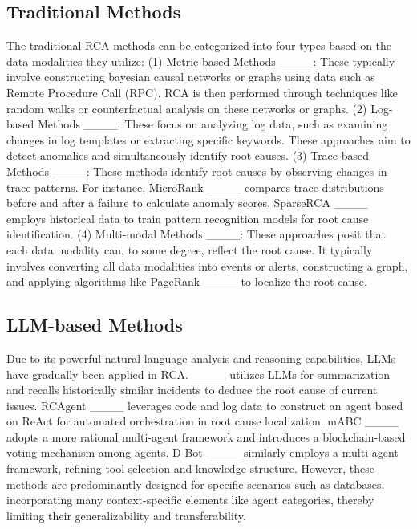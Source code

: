 \subsection{Traditional Methods}

The traditional RCA methods can be categorized into four types based on the data modalities they utilize: (1) Metric-based Methods ____: These typically involve constructing bayesian causal networks or graphs using data such as Remote Procedure Call (RPC). RCA is then performed through techniques like random walks or counterfactual analysis on these networks or graphs. (2) Log-based Methods ____: These focus on analyzing log data, such as examining changes in log templates or extracting specific keywords. These approaches aim to detect anomalies and simultaneously identify root causes. (3) Trace-based Methods ____: These methods identify root causes by observing changes in trace patterns. For instance, MicroRank ____ compares trace distributions before and after a failure to calculate anomaly scores. SparseRCA ____ employs historical data to train pattern recognition models for root cause identification. (4) Multi-modal Methods ____: These approaches posit that each data modality can, to some degree, reflect the root cause. It typically involves converting all data modalities into events or alerts, constructing a graph, and applying algorithms like PageRank ____ to localize the root cause.


\subsection{LLM-based Methods}

Due to its powerful natural language analysis and reasoning capabilities, LLMs have gradually been applied in RCA. ____ utilizes LLMs for summarization and recalls historically similar incidents to deduce the root cause of current issues. RCAgent ____ leverages code and log data to construct an agent based on ReAct for automated orchestration in root cause localization. mABC ____ adopts a more rational multi-agent framework and introduces a blockchain-based voting mechanism among agents. D-Bot ____ similarly employs a multi-agent framework, refining tool selection and knowledge structure. However, these methods are predominantly designed for specific scenarios such as databases, incorporating many context-specific elements like agent categories, thereby limiting their generalizability and transferability.
